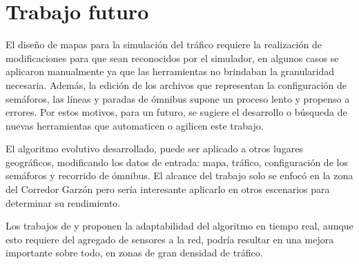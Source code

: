 \section{Trabajo futuro}

El diseño de mapas para la simulación del tráfico requiere la realización de modificaciones para que sean reconocidos por el simulador, en algunos casos se aplicaron manualmente ya que las herramientas no brindaban la granularidad necesaria. Además, la edición de los archivos que representan la configuración de semáforos, las líneas y paradas de ómnibus supone un proceso lento y propenso a errores. Por estos motivos, para un futuro, se sugiere el desarrollo o búsqueda de nuevas herramientas que automaticen o agilicen este trabajo.

El algoritmo evolutivo desarrollado, puede ser aplicado a otros lugares geográficos, modificando  los datos de entrada: mapa, tráfico, configuración de los semáforos y recorrido de ómnibus. El alcance del trabajo solo se enfocó en la zona del Corredor Garzón pero sería interesante aplicarlo en otros escenarios para determinar su rendimiento.

Los trabajos de  \citet{Montana1996} y \citet{Vogel2000} proponen la adaptabilidad del algoritmo en tiempo real, aunque esto requiere del agregado de sensores a la red, podría resultar en una mejora importante sobre todo, en zonas de gran densidad de tráfico.

